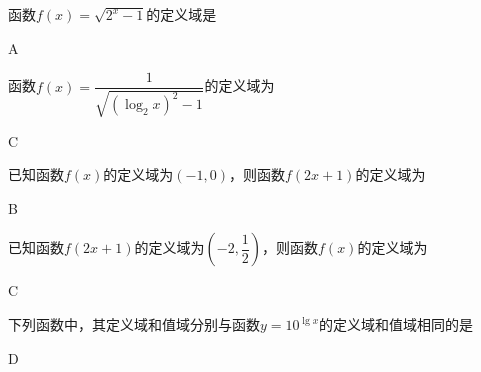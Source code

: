   \begin{exercise}
    \item
      函数$f(x)=\sqrt{2^x-1}$的定义域是\xz
      \begin{answer}
        A
      \end{answer}
    \item
      函数$f(x)=\dfrac{1}{\sqrt{\left(\log_2x\right)^2-1}}$的定义域为\xz
      \xx{$ \left(0,\dfrac{1}{2}\right)$}{$ \left(2,+\infty\right)$}{$ \left(0,\dfrac{1}{2}\right)\bigcup\left(2,+\infty\right)$}{$ \left(0,\dfrac{1}{2}\right]\bigcup\left[2,+\infty\right)$}
      \begin{answer}
        C
      \end{answer}
    \item
      已知函数$f(x)$的定义域为$(-1,0)$，则函数$f(2x+1)$的定义域为\xz
      \begin{answer}
        B
      \end{answer}
    \item
      已知函数$f(2x+1)$的定义域为$\left(-2,\dfrac{1}{2}\right)$，则函数$f(x)$的定义域为\xz
      \begin{answer}
        C
      \end{answer}
    \item
      下列函数中，其定义域和值域分别与函数$y=10^{\lg x}$的定义域和值域相同的是\xz
      \begin{answer}
        D
      \end{answer}
  \end{exercise}
\vspace{5em}
